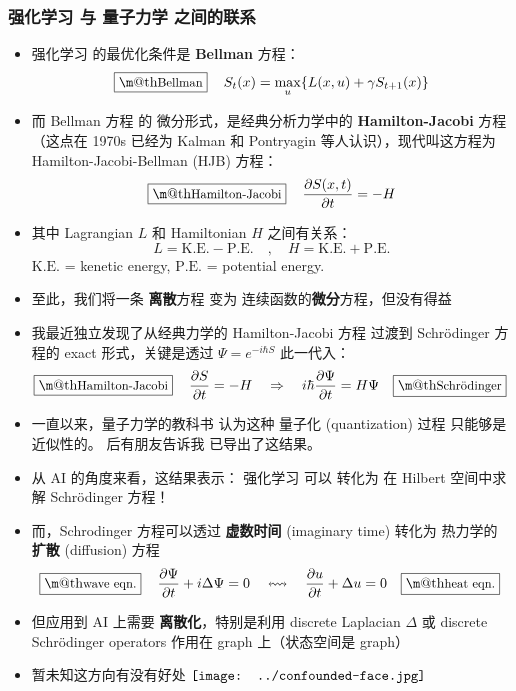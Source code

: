 \documentclass[15pt]{beamer}
\makeatletter
\newcommand{\red}[1]{{\color{red}#1}}
\newcommand*\confoundFace{$\vcenter{\hbox{\texttt{[image: ../confounded-face.jpg]}}}$}
\renewcommand{\boxed}[1]{\fbox{\m@th$\displaystyle\scalebox{0.9}{#1}$} \,}
\makeatother
\begin{document}
\begin{frame}
\frametitle{强化学习 与 量子力学 之间的联系}
\begin{itemize}
	\item 强化学习 的最优化条件是 \textbf{Bellman} 方程：
		\begin{equation}
			\boxed{\mbox{Bellman}} \quad S_t(x) = \max_u \{ L(x,u) + \gamma S_{t+1}(x) \}
		\end{equation}
	\item 而 Bellman 方程 的 微分形式，是经典分析力学中的 \textbf{Hamilton-Jacobi} 方程 （这点在 1970s 已经为 Kalman 和 Pontryagin 等人认识），现代叫这方程为 Hamilton-Jacobi-Bellman (HJB) 方程：
		\begin{equation}
			\boxed{\mbox{Hamilton-Jacobi}} \quad \frac{\partial S(x, t)}{\partial t} = -H
		\end{equation}
	\item 其中 Lagrangian $L$ 和 Hamiltonian $H$ 之间有关系：
	\begin{equation}
		L = \text{K.E.} - \text{P.E.} \quad , \quad H = \text{K.E.} + \text{P.E.}
	\end{equation}
		$\text{K.E.}$ = kenetic energy, $\text{P.E.}$ = potential energy.
	\item 至此，我们将一条 \textbf{离散}方程 变为 连续函数的\textbf{微分}方程，但\red{没有得益}
\end{itemize}
\end{frame}

\begin{frame}[plain]
\begin{itemize}
	\item 我最近独立发现了从经典力学的 Hamilton-Jacobi 方程 过渡到 Schr\"{o}dinger 方程的 exact 形式，关键是透过 $\Psi = e^{-i \hbar S}$ 此一代入：
		\begin{equation}
		\boxed{\mbox{Hamilton-Jacobi}} \quad \frac{\partial S}{\partial t} = - H \quad
		\Rightarrow
		\quad i \hbar \frac{\partial \Psi}{\partial t} = H \Psi \quad \boxed{\mbox{Schr\"{o}dinger}}
		\end{equation} 
	\item 一直以来，量子力学的教科书 认为这种 量子化 (quantization) 过程 只能够是近似性的。  后有朋友告诉我 \parencite{Field2010} 已导出了这结果。
	\item 从 AI 的角度来看，这结果表示： \red{强化学习 可以 转化为 在 Hilbert 空间中求解 Schr\"{o}dinger 方程！}
	\item 而，Schrodinger 方程可以透过 \textbf{虚数时间} (imaginary time) 转化为 热力学的 \textbf{扩散} (diffusion) 方程
		\begin{equation}
			\boxed{\mbox{wave eqn.}} \quad \frac{\partial \Psi}{\partial t} + i \Delta \Psi = 0
			\quad \leftrightsquigarrow \quad
			\frac{\partial u}{\partial t} + \Delta u = 0 \quad \boxed{\mbox{heat eqn.}}
		\end{equation}
	\item 但应用到 AI 上需要 \textbf{离散化}，特别是利用 discrete Laplacian $\Delta$ 或 discrete Schr\"{o}dinger operators 作用在 \red{graph} 上（状态空间是 graph）
	\item 暂未知这方向有没有好处 \confoundFace
\end{itemize}
\end{frame}
\end{document}

